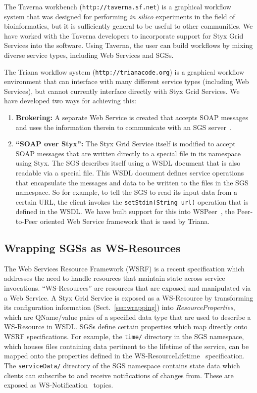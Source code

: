 \documentclass[a4paper]{article}
\begin{document}
The Taverna workbench (\texttt{http://taverna.sf.net}) is a graphical workflow system that was designed for performing {\it in silico} experiments in the field of bioinformatics, but it is sufficiently general to be useful to other communities.  We have worked with the Taverna developers to incorporate support for Styx Grid Services into the software.  Using Taverna, the user can build workflows by mixing diverse service types, including Web Services and SGSs.

The Triana workflow system (\texttt{http://trianacode.org}) is a graphical workflow environment that can interface with many different service types (including Web Services), but cannot currently interface directly with Styx Grid Services.  We have developed two ways for achieving this:

\begin{enumerate}
	\item {\bf Brokering:} A separate Web Service is created that accepts SOAP messages and uses the information therein to communicate with an SGS server~\cite{blower:2005}.
	\item {\bf ``SOAP over Styx'':} The Styx Grid Service itself is modified to accept SOAP messages that are written directly to a special file in its namespace using Styx.  The SGS describes itself using a WSDL document that is also readable via a special file.  This WSDL document defines service operations that encapsulate the messages and data to be written to the files in the SGS namespace.  So for example, to tell the SGS to read its input data from a certain URL, the client invokes the \texttt{setStdin(String url)} operation that is defined in the WSDL. We have built support for this into WSPeer~\cite{wspeer}, the Peer-to-Peer oriented Web Service framework that is used by Triana.
\end{enumerate}

\subsection{Wrapping SGSs as WS-Resources}\label{subsec:ws-resources}

The Web Services Resource Framework (WSRF) is a recent specification which addresses the need to handle resources that maintain state across service invocations. ``WS-Resources'' are resources that are exposed and manipulated via a Web Service. A Styx Grid Service is exposed as a WS-Resource by transforming its configuration information (Sect.~\ref{sec:wrapping}) into \textit{ResourceProperties\/}, which are QName/value pairs of a specified data type that are used to describe a WS-Resource in WSDL. SGSs define certain properties which map directly onto WSRF specifications. For example, the \texttt{time/} directory in the SGS namespace, which houses files containing data pertinent to the lifetime of the service, can be mapped onto the properties defined in the WS-ResourceLifetime~\cite{wsrf-lifetime} specification.  The \texttt{serviceData/} directory of the SGS namespace contains state data which clients can subscribe to and receive notifications of changes from. These are exposed as WS-Notification~\cite{wsrf-notification} topics.
\end{document}
